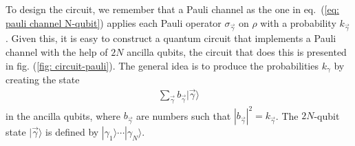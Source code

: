 \documentclass[10pt,letterpaper]{article} %
\begin{document}
To design the circuit, we remember that a Pauli channel as the one in
eq.~(\ref{eq: pauli channel N-qubit})
applies each Pauli operator $\sigma_{\vec{\gamma}}$ on $\rho$ with a probability $k_{\vec{\gamma}}$.
Given this, it is easy to construct a quantum circuit that implements 
a Pauli channel with the help of $2N$ ancilla qubits,
the circuit that does this is presented in fig. (\ref{fig: circuit-pauli}).
The general idea is to produce the probabilities $k_{\gamma}$ by creating the state
\begin{eqnarray}
\label{eq: state}
\sum_{\vec{\gamma}} b_{\vec{\gamma}} |\vec{\gamma} \rangle
\end{eqnarray}
in the ancilla qubits, 
where $b_{\vec{\gamma}}$ are numbers such that $
|b_{\vec{\gamma}}|^2 = k_{\vec{\gamma}}$.
The $2N$-qubit state $|\vec{\gamma}\rangle$  is defined by $|\gamma_1 \rangle \cdots |\gamma_N\rangle$.

\end{document}
